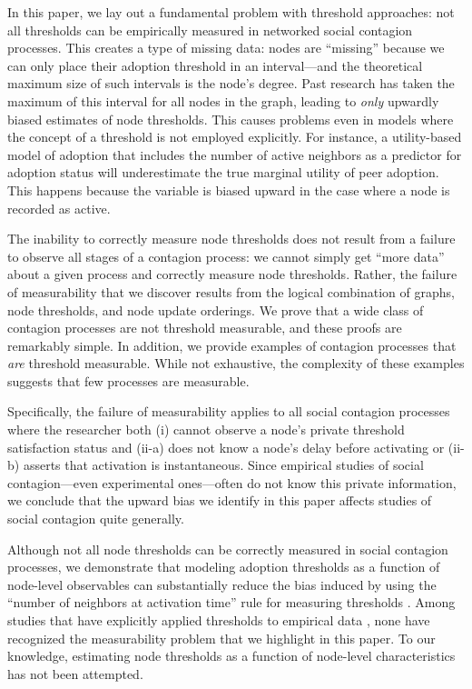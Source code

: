 \documentclass[a4paper]{article}
\begin{document}
In this paper, we lay out a fundamental problem with threshold approaches: not all thresholds can be empirically measured in networked social contagion processes. This creates a type of missing data: nodes are ``missing'' because we can only place their adoption threshold in an interval---and the theoretical maximum size of such intervals is the node's degree. Past research has taken the maximum of this interval for all nodes in the graph, leading to \emph{only} upwardly biased estimates of node thresholds. This causes problems even in models where the concept of a threshold is not employed explicitly. For instance, a utility-based model of adoption that includes the number of active neighbors as a predictor for adoption status will underestimate the true marginal utility of peer adoption. This happens because the variable is biased upward in the case where a node is recorded as active.

The inability to correctly measure node thresholds does not result from a failure to observe all stages of a contagion process: we cannot simply get ``more data'' about a given process and correctly measure node thresholds. Rather, the failure of measurability that we discover results from the logical combination of graphs, node thresholds, and node update orderings. We prove that a wide class of contagion processes are not threshold measurable, and these proofs are remarkably simple. In addition, we provide examples of contagion processes that \emph{are} threshold measurable. While not exhaustive, the complexity of these examples suggests that few processes are measurable.

Specifically, the failure of measurability applies to all social contagion processes where the researcher both (i) cannot observe a node's private threshold satisfaction status and (ii-a) does not know a node's delay before activating or (ii-b) asserts that activation is instantaneous. Since empirical studies of social contagion---even experimental ones---often do not know this private information, we conclude that the upward bias we identify in this paper affects studies of social contagion quite generally.

Although not all node thresholds can be correctly measured in social contagion processes, we demonstrate that modeling adoption thresholds as a function of node-level observables can substantially reduce the bias induced by using the ``number of neighbors at activation time'' rule for measuring thresholds \parencite{Valente1996}. Among studies that have explicitly applied thresholds to empirical data \parencite{Valente1995, Valente1996, Ludemann1999a, Romero2011}, none have recognized the measurability problem that we highlight in this paper. To our knowledge, estimating node thresholds as a function of node-level characteristics has not been attempted.
\end{document}
